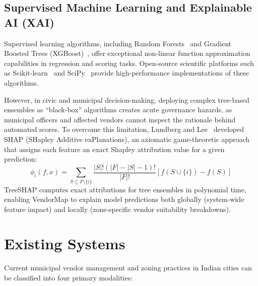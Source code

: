 \subsection{Supervised Machine Learning and Explainable AI (XAI)}
Supervised learning algorithms, including Random Forests~\cite{breiman2001random} and Gradient Boosted Trees (XGBoost)~\cite{chen2016xgboost}, offer exceptional non-linear function approximation capabilities in regression and scoring tasks. Open-source scientific platforms such as Scikit-learn~\cite{pedregosa2011scikit} and SciPy~\cite{virtanen2020scipy} provide high-performance implementations of these algorithms. 

However, in civic and municipal decision-making, deploying complex tree-based ensembles as ``black-box'' algorithms creates acute governance hazards, as municipal officers and affected vendors cannot inspect the rationale behind automated scores. To overcome this limitation, Lundberg and Lee~\cite{lundberg2017unified} developed SHAP (SHapley Additive exPlanations), an axiomatic game-theoretic approach that assigns each feature an exact Shapley attribution value for a given prediction:
\begin{equation}
    \phi_i(f, x) = \sum_{S \subseteq F \setminus \{i\}} \frac{|S|! (|F| - |S| - 1)!}{|F|!} \left[ f(S \cup \{i\}) - f(S) \right]
    \label{eq:lit_shap}
\end{equation}
TreeSHAP computes exact attributions for tree ensembles in polynomial time, enabling VendorMap to explain model predictions both globally (system-wide feature impact) and locally (zone-specific vendor suitability breakdowns).

\section{Existing Systems}
\label{sec:existing_systems}

Current municipal vendor management and zoning practices in Indian cities can be classified into four primary modalities:

